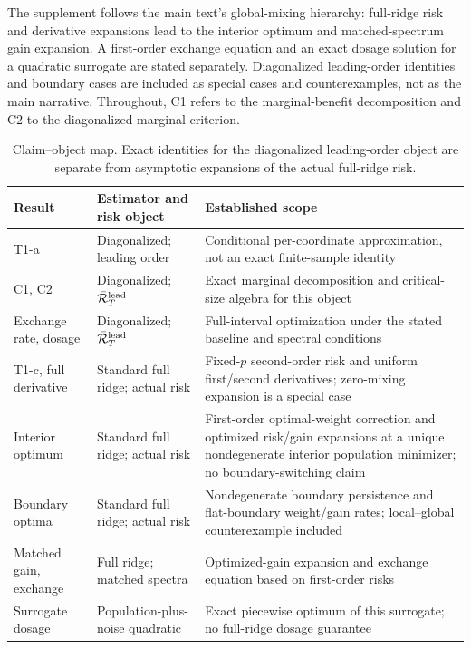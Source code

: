 
The supplement follows the main text's global-mixing hierarchy: full-ridge risk and derivative expansions lead to the interior optimum and matched-spectrum gain expansion. A first-order exchange equation and an exact dosage solution for a quadratic surrogate are stated separately. Diagonalized leading-order identities and boundary cases are included as special cases and counterexamples, not as the main narrative. Throughout, C1 refers to the marginal-benefit decomposition and C2 to the diagonalized marginal criterion.

\begin{table}[h]
  \centering
  \small
  \caption{Claim--object map. Exact identities for the diagonalized leading-order object are separate from asymptotic expansions of the actual full-ridge risk.}
  \label{supp:tab:claimobjects}
  \begin{tabular}{@{}p{.17\linewidth}p{.29\linewidth}p{.42\linewidth}@{}}
    \toprule
    Result & Estimator and risk object & Established scope \\
    \midrule
    T1-a & Diagonalized; leading order & Conditional per-coordinate approximation, not an exact finite-sample identity \\
    C1, C2 & Diagonalized; $\bar{\mathcal{R}}_T^{\mathrm{lead}}$ & Exact marginal decomposition and critical-size algebra for this object \\
    Exchange rate, dosage & Diagonalized; $\bar{\mathcal{R}}_T^{\mathrm{lead}}$ & Full-interval optimization under the stated baseline and spectral conditions \\
    T1-c, full derivative & Standard full ridge; actual risk & Fixed-$p$ second-order risk and uniform first/second derivatives; zero-mixing expansion is a special case \\
    Interior optimum & Standard full ridge; actual risk & First-order optimal-weight correction and optimized risk/gain expansions at a unique nondegenerate interior population minimizer; no boundary-switching claim \\
    Boundary optima & Standard full ridge; actual risk & Nondegenerate boundary persistence and flat-boundary weight/gain rates; local--global counterexample included \\
    Matched gain, exchange & Full ridge; matched spectra & Optimized-gain expansion and exchange equation based on first-order risks \\
    Surrogate dosage & Population-plus-noise quadratic & Exact piecewise optimum of this surrogate; no full-ridge dosage guarantee \\
    \bottomrule
  \end{tabular}
\end{table}


